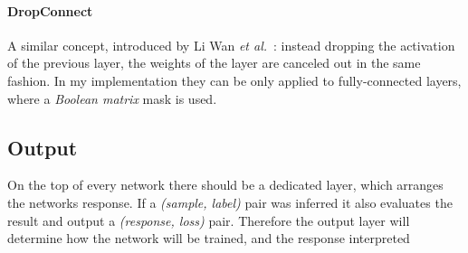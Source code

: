 \paragraph{DropConnect} A similar concept, introduced by Li Wan \emph{et al.}~\cite{dropcon}: 
instead dropping the activation of the previous layer, the weights of the layer are canceled out in the same fashion.
In my implementation they can be only applied to fully-connected layers, where a \emph{Boolean matrix} mask is used.

\subsection{Output} 
On the top of every network there should be a dedicated layer, which arranges the networks response. 
If a \emph{(sample, label)} pair was inferred it also evaluates the result and output a \emph{(response, loss)} pair.
Therefore the output layer will determine how the network will be trained, and the response interpreted
